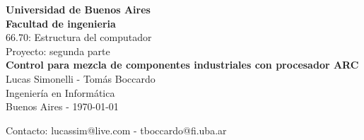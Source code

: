 

\begin{center}
{\bf{\Huge Universidad de Buenos Aires}}\\[0.5cm]
{\bf{\Huge Facultad de ingenieria}}\\[0.3cm]

{\LARGE 66.70: Estructura del computador}\\[1.25cm]
{\Large Proyecto: segunda parte}\\[2.3cm]
{\LARGE {\bf Control para mezcla de componentes industriales con procesador ARC}}\\[3.5cm]
{\large Lucas Simonelli - Tomás Boccardo}\\[2cm]
Ingeniería en Informática\\[1cm]
Buenos Aires - \today
\\[5.2cm]
\end{center}

{Contacto: lucassim@live.com - tboccardo@fi.uba.ar}\\[2cm]
